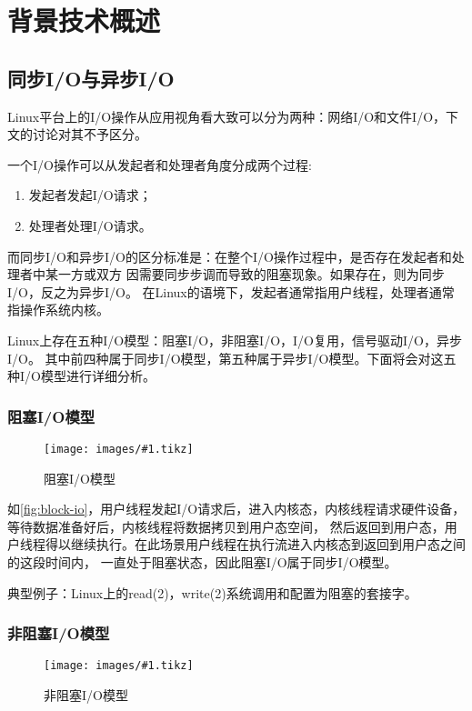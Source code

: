 \documentclass[supercite]{HustGraduPaper}
\newcommand{\cfig}[3]{
  \begin{figure}[htb]
    \centering
    \texttt{[image: images/\#1.tikz]}
    \caption{#3}
    \label{fig:#1}
  \end{figure}
}
\newcommand{\rfig}[1]{\autoref{fig:#1}}
\theoremstyle{definition}
\begin{document}
\section{背景技术概述}

\subsection{同步I/O与异步I/O}
Linux平台上的I/O操作从应用视角看大致可以分为两种：网络I/O和文件I/O，下文的讨论对其不予区分。\par

一个I/O操作可以从发起者和处理者角度分成两个过程:
\begin{enumerate}[label={(\arabic*)}]
    \item 发起者发起I/O请求；
    \item 处理者处理I/O请求。
\end{enumerate}\par

而同步I/O和异步I/O的区分标准是：在整个I/O操作过程中，是否存在发起者和处理者中某一方或双方
因需要同步步调而导致的阻塞现象。如果存在，则为同步I/O，反之为异步I/O。
在Linux的语境下，发起者通常指用户线程，处理者通常指操作系统内核。\par

Linux上存在五种I/O模型：阻塞I/O，非阻塞I/O，I/O复用，信号驱动I/O，异步I/O。
其中前四种属于同步I/O模型，第五种属于异步I/O模型。下面将会对这五种I/O模型进行详细分析。\par

\subsubsection{阻塞I/O模型}
\cfig{block-io}{0.5}{阻塞I/O模型}

如\rfig{block-io}，用户线程发起I/O请求后，进入内核态，内核线程请求硬件设备，等待数据准备好后，内核线程将数据拷贝到用户态空间，
然后返回到用户态，用户线程得以继续执行。在此场景用户线程在执行流进入内核态到返回到用户态之间的这段时间内，
一直处于阻塞状态，因此阻塞I/O属于同步I/O模型。\par

典型例子：Linux上的read(2)，write(2)系统调用和配置为阻塞的套接字。\par


\subsubsection{非阻塞I/O模型}
\cfig{nonblock-io}{0.5}{非阻塞I/O模型}
\end{document}
